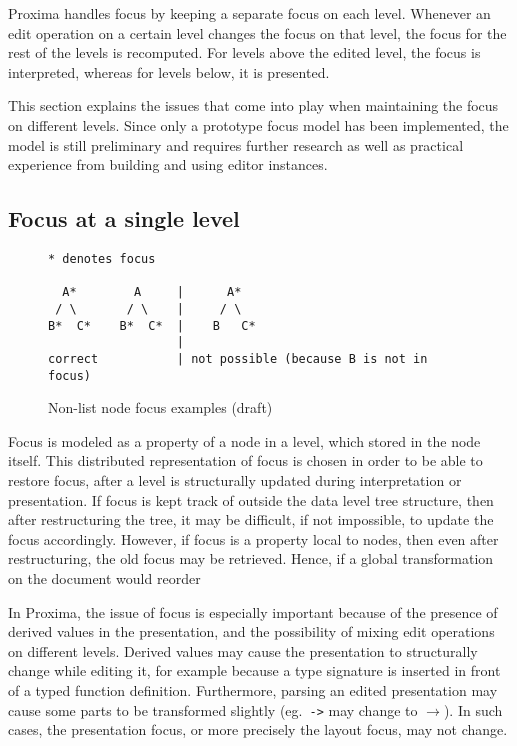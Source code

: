 Proxima handles focus by keeping a separate focus on each level. Whenever an edit operation on a certain level changes the focus on that level, the focus for the rest of the levels is recomputed. For levels above the edited level, the focus is interpreted, whereas for levels below, it is presented.

This section explains the issues that come into play when maintaining the focus on different levels. Since only a prototype focus model has been implemented, the model is still preliminary and requires further research as well as practical experience from building and using editor instances. 

 
%																
\subsection{Focus at a single level}

\begin{figure}
\begin{small}
\begin{center}
\begin{verbatim}
* denotes focus

  A*        A     |      A*
 / \       / \    |     / \
B*  C*    B*  C*  |    B   C*
                  |
correct           | not possible (because B is not in focus)
\end{verbatim}
\caption{Non-list node focus examples (draft)}\label{correctIncorrect focus} 
\end{center}
\end{small}
\end{figure}

Focus is modeled as a property of a node in a level, which stored in the node itself. This distributed representation of focus is chosen in order to be able to restore focus, after a level is structurally updated during interpretation or presentation. If focus is kept track of outside the data level tree structure, then after restructuring the tree, it may be difficult, if not impossible, to update the focus accordingly. However, if focus is a property local to nodes, then even after restructuring, the old focus may be retrieved. Hence, if a global transformation on the document would reorder 

In Proxima, the issue of focus is especially important because of the presence of derived values in the presentation, and the possibility of mixing edit operations on different levels. Derived values may cause the presentation to structurally change while editing it, for example because a type signature is inserted in front of a typed function definition. Furthermore, parsing an edited presentation may cause some parts to be transformed slightly (eg.\ \verb|->| may change to $\rightarrow$). In such cases, the presentation focus, or more precisely the layout focus, may not change.

